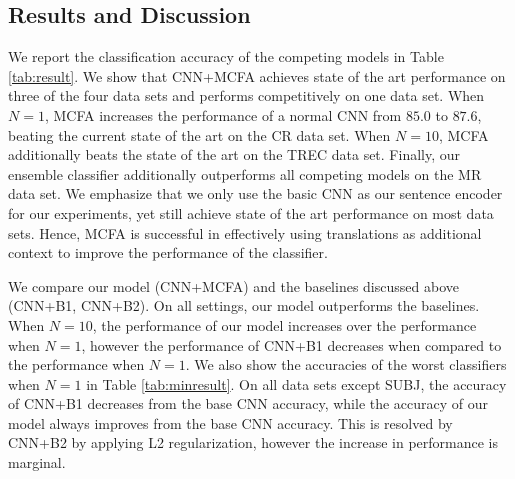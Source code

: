 \documentclass{article}
\begin{document}
\begin{table*}[htbp]
\begin{tabular}{|c|ccc|ccc|ccc|ccc|}
		\hline
	\end{tabular}\caption{Classification accuracies of competing models. \textbf{C} refers to the additional context, $N$ refers to the number of translations. In TopCNN, word refers to using word-specific topic while sentence refers to using sentence-specific topic. 
Accuracies colored \textcolor[rgb]{1,0,0}{red} are accuracies that perform worse than CNN. Previous state of the art results and the results of our best model are \textbf{bold-faced}. The winning result is \underline{underlined}. The number inside the parenthesis indicates the increase from the base model, CNN.}
	\label{tab:result}\end{table*}

\subsection{Results and Discussion}

We report the classification accuracy of the competing models in Table \ref{tab:result}. We show that CNN+MCFA achieves state of the art performance on three of the four data sets and performs competitively on one data set. When $N=1$, MCFA increases the performance of a normal CNN from $85.0$ to $87.6$, beating the current state of the art on the CR data set. When $N=10$, MCFA additionally beats the state of the art on the TREC data set. Finally, our ensemble classifier additionally outperforms all competing models on the MR data set. We emphasize that we only use the basic CNN as our sentence encoder for our experiments, yet still achieve state of the art performance on most data sets. Hence, MCFA is successful in effectively using translations as additional context to improve the performance of the classifier.

We compare our model (CNN+MCFA) and the baselines discussed above (CNN+B1, CNN+B2). On all settings, our model outperforms the baselines. When $N=10$, the performance of our model increases over the performance when $N=1$, however the performance of CNN+B1 decreases when compared to the performance when $N=1$. We also show the accuracies of the worst classifiers when $N=1$ in Table \ref{tab:minresult}. On all data sets except SUBJ, the accuracy of CNN+B1 decreases from the base CNN accuracy, while the accuracy of our model always improves from the base CNN accuracy.
This is resolved by CNN+B2 by applying L2 regularization, however the increase in performance is marginal. 
\end{document}

